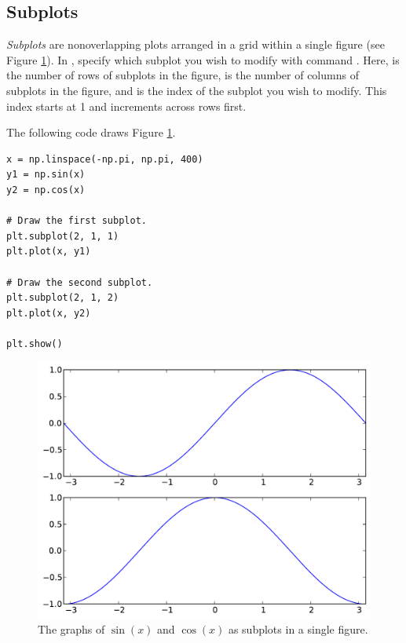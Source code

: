 \subsection*{Subplots}
\emph{Subplots} are nonoverlapping plots arranged in a grid within a single figure (see Figure \ref{fig:subplots}).
In , specify which subplot you wish to modify with command .
Here,  is the number of rows of subplots in the figure,  is the number of columns of subplots in the figure, and  is the index of the subplot you wish to modify.
This index starts at 1 and increments across rows first.

The following code draws Figure \ref{fig:subplots}.
\begin{lstlisting}
x = np.linspace(-np.pi, np.pi, 400)
y1 = np.sin(x)
y2 = np.cos(x)

# Draw the first subplot.
plt.subplot(2, 1, 1)
plt.plot(x, y1)

# Draw the second subplot.
plt.subplot(2, 1, 2)
plt.plot(x, y2)

plt.show()
\end{lstlisting}

\begin{figure}
\includegraphics[width=.7\textwidth]{subplots.pdf}
\caption{The graphs of $\sin(x)$ and $\cos(x)$ as subplots in a single figure.}
\label{fig:subplots}
\end{figure}

